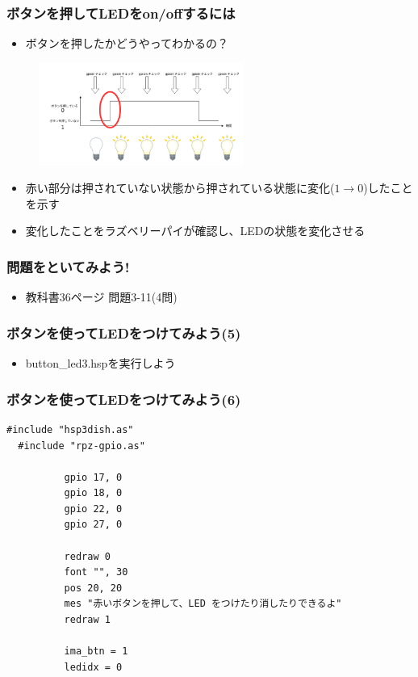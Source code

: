 \begin{frame}
  \frametitle{ボタンを押してLEDをon/offするには}
  \begin{itemize}
    \item ボタンを押したかどうやってわかるの？
  \end{itemize}
  \begin{figure}
    \centering
    \includegraphics[width=0.6\textwidth]{../images/chap03/button_push.png}
  \end{figure}
  \begin{itemize}
    \item 赤い部分は押されていない状態から押されている状態に変化($1\rightarrow0$)したことを示す
    \item 変化したことをラズベリーパイが確認し、LEDの状態を変化させる
  \end{itemize}
\end{frame}

\begin{frame}
  \frametitle{問題をといてみよう!}
  \begin{itemize}
    \item 教科書36ページ 問題3-11(4問)
  \end{itemize}
\end{frame}

\begin{frame}
  \frametitle{ボタンを使ってLEDをつけてみよう(5)}
  \begin{itemize}
    \item button\_led3.hspを実行しよう
  \end{itemize}
\end{frame}

\begin{frame}[fragile]
  \frametitle{ボタンを使ってLEDをつけてみよう(6)}
  \begin{lstlisting}[title=button\_led3.hsp, label=button_led3.hsp]
  #include "hsp3dish.as"
  #include "rpz-gpio.as"
  
          gpio 17, 0   
          gpio 18, 0
          gpio 22, 0
          gpio 27, 0

          redraw 0
          font "", 30
          pos 20, 20
          mes "赤いボタンを押して、LED をつけたり消したりできるよ"
          redraw 1

          ima_btn = 1 
          ledidx = 0
  \end{lstlisting}
\end{frame}

